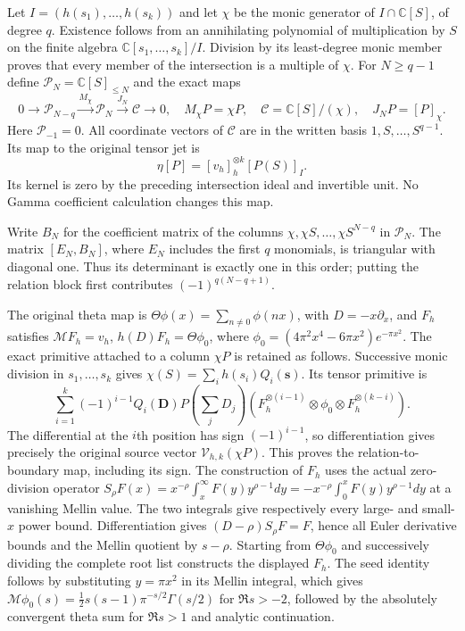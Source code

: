 \documentclass[11pt]{article}
\newcommand{\C}{\mathbb C}
\begin{document}
Let $I=(h(s_1),\ldots,h(s_k))$ and let $\chi$ be the monic generator
of $I\cap\C[S]$, of degree $q$. Existence follows from an annihilating
polynomial of multiplication by $S$ on the finite algebra
$\C[s_1,\ldots,s_k]/I$. Division by its least-degree monic member
proves that every member of the intersection is a multiple of $\chi$.
For $N\ge q-1$ define $\mathcal P_N=\C[S]_{\le N}$ and the exact maps
\[
 0\longrightarrow\mathcal P_{N-q}
 \xrightarrow{M_\chi}\mathcal P_N
 \xrightarrow{J_N}\mathcal C\longrightarrow0,
 \quad M_\chi P=\chi P,\quad
 \mathcal C=\C[S]/(\chi),\quad J_NP=[P]_\chi.                   \tag{GMT.3}
\]
Here $\mathcal P_{-1}=0$. All coordinate vectors of $\mathcal C$ are
in the written basis $1,S,\ldots,S^{q-1}$. Its map to the original
tensor jet is
\[
 \eta[P]=[v_h]_h^{\otimes k}[P(S)]_I.
\]
Its kernel is zero by the preceding intersection ideal and invertible
unit. No Gamma coefficient calculation changes this map.

Write $B_N$ for the coefficient matrix of the columns
$\chi,\chi S,\ldots,\chi S^{N-q}$ in $\mathcal P_N$. The matrix
$[E_N,B_N]$, where $E_N$ includes the first $q$ monomials, is triangular
with diagonal one. Thus its determinant is exactly one in this order;
putting the relation block first contributes $(-1)^{q(N-q+1)}$.

The original theta map is $\Theta\phi(x)=\sum_{n\ne0}\phi(nx)$,
with $D=-x\partial_x$, and $F_h$ satisfies
$\mathcal MF_h=v_h$, $h(D)F_h=\Theta\phi_0$, where
$\phi_0=(4\pi^2x^4-6\pi x^2)e^{-\pi x^2}$.
The exact primitive attached to a column $\chi P$ is retained as follows.
Successive monic division in $s_1,\ldots,s_k$ gives
$\chi(S)=\sum_i h(s_i)Q_i(\mathbf s)$. Its tensor primitive is
\[
 \sum_{i=1}^k(-1)^{i-1}Q_i(\mathbf D)P(\textstyle\sum_jD_j)
 (F_h^{\otimes(i-1)}\otimes\phi_0\otimes
                F_h^{\otimes(k-i)}).                           \tag{GMT.4}
\]
The differential at the $i$th position has sign $(-1)^{i-1}$,
so differentiation gives precisely the original source vector
$\mathcal V_{h,k}(\chi P)$. This proves the relation-to-boundary
map, including its sign. The construction of $F_h$ uses the actual
zero-division operator
$S_\rho F(x)=x^{-\rho}\int_x^\infty F(y)y^{\rho-1}dy
=-x^{-\rho}\int_0^xF(y)y^{\rho-1}dy$ at a vanishing Mellin value.
The two integrals give respectively every large- and small-$x$ power
bound. Differentiation gives $(D-\rho)S_\rho F=F$, hence all Euler
derivative bounds and the Mellin quotient by $s-\rho$.
Starting from $\Theta\phi_0$ and successively dividing the complete
root list constructs the displayed $F_h$. The seed identity follows
by substituting $y=\pi x^2$ in its Mellin integral, which gives
$\mathcal M\phi_0(s)=\tfrac12s(s-1)\pi^{-s/2}\Gamma(s/2)$
for $\Re s>-2$, followed by the absolutely convergent theta sum
for $\Re s>1$ and analytic continuation.
\end{document}
